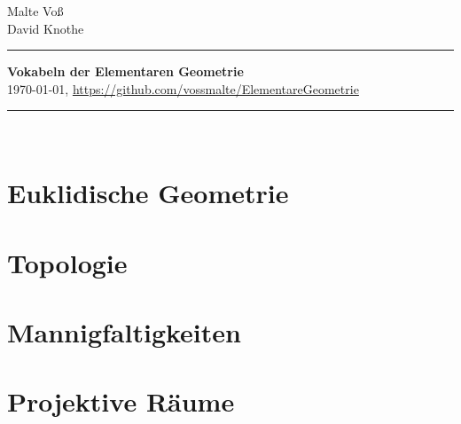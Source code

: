 \documentclass[a4paper,11pt]{article} %
\theoremstyle{costum} %
\begin{document}
%
\hfill \parbox{24mm}
{
Malte Vo\ss\\
David Knothe\\
}

\rule{\textwidth}{1pt}                                   %
%
\begin{center}
\textbf{
Vokabeln der Elementaren Geometrie \\[1ex] %
}
{
%
%
\today, \url{https://github.com/vossmalte/ElementareGeometrie}
}
\end{center}
%
\rule{\textwidth}{1pt}\\                                 %
\section{Euklidische Geometrie}

\vspace{3ex}
\section{Topologie}

\vspace{3ex}
\section{Mannigfaltigkeiten}

\vspace{3ex}
\section{Projektive Räume}

\vspace{3ex}
\end{document}
